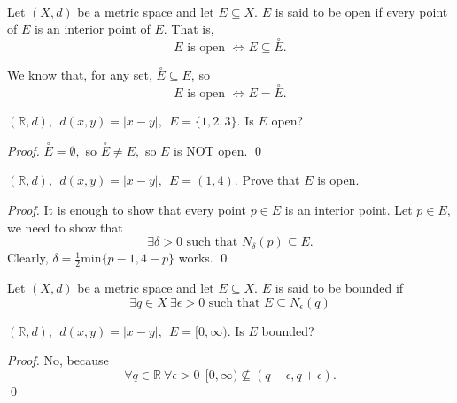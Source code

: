 \begin{definition}  \leavevmode \\
    Let $(X, d)$ be a metric space and let $E\subseteq X$.
    $E$ is said to be open if every point of $E$ is an interior point of $E$. That is,
    $$E \text{ is open } \iff E\subseteq \overset{\circ}{E}.$$
\end{definition}

\begin{note}
    We know that, for any set, $\overset{\circ}{E} \subseteq E$, so
    $$E \text{ is open } \iff E = \overset{\circ}{E}.$$
\end{note}

\begin{example}
    $(\mathbb{R}, d), ~~ d(x,y) = |x - y|, ~~E=\{1,2,3\}$. Is $E$ open?
\end{example}

\begin{proof}
    $\overset{\circ}{E} = \emptyset,$ so $\overset{\circ}{E} \not = E,$ so $E$ is NOT open.
    \qed
\end{proof}

\begin{example}
    $(\mathbb{R}, d), ~~ d(x,y) = |x - y|, ~~E = (1,4).$ Prove that $E$ is open.
\end{example}

\begin{proof}
    It is enough to show that every point $p \in E$ is an interior point. Let $p \in E,$ we need to show that $$\exists \delta > 0 \text { such that } N_\delta (p) \subseteq E.$$Clearly, $\delta = \frac{1}{2}\text{min}\{p-1, 4-p\}$ works.
    \qed
\end{proof}

\begin{definition} 
    Let $(X,d)$ be a metric space and let $E\subseteq X$.
    $E$ is said to be bounded if
    $$\exists q\in X ~\exists \epsilon > 0 \text{ such that } E \subseteq N_\epsilon (q)$$
\end{definition}

\begin{example}
    $(\mathbb{R}, d), ~~d(x,y) = |x- y|, ~~E= [0, \infty).$ Is $E$ bounded?
\end{example}

\begin{proof}
    No, because
    $$\forall q \in \mathbb{R} ~\forall \epsilon > 0 ~~ [0, \infty) \not \subseteq (q - \epsilon, q + \epsilon).$$
    \qed
\end{proof}

